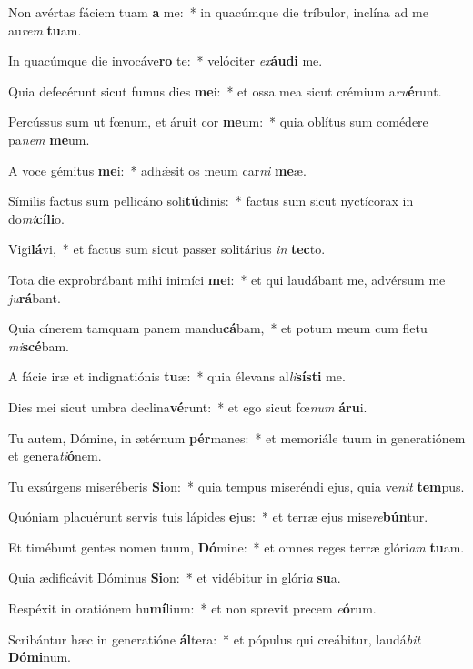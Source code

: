 \item Non avértas fáciem tuam \textbf{a} me:~* in quacúmque die tríbulor, inclína ad me au\textit{rem} \textbf{tu}am.
\item In quacúmque die invocáve\textbf{ro} te:~* velóciter \textit{ex}\textbf{áu}\textbf{di} me.
\item Quia defecérunt sicut fumus dies \textbf{me}i:~* et ossa mea sicut crémium a\textit{ru}\textbf{é}runt.
\item Percússus sum ut fœnum, et áruit cor \textbf{me}um:~* quia oblítus sum comédere pa\textit{nem} \textbf{me}um.
\item A voce gémitus \textbf{me}i:~* adhǽsit os meum car\textit{ni} \textbf{me}æ.
\item Símilis factus sum pellicáno soli\textbf{tú}dinis:~* factus sum sicut nyctícorax in do\textit{mi}\textbf{cí}\textbf{li}o.
\item Vigi\textbf{lá}vi,~* et factus sum sicut passer solitárius \textit{in} \textbf{tec}to.
\item Tota die exprobrábant mihi inimíci \textbf{me}i:~* et qui laudábant me, advérsum me \textit{ju}\textbf{rá}bant.
\item Quia cínerem tamquam panem mandu\textbf{cá}bam,~* et potum meum cum fletu \textit{mi}\textbf{scé}bam.
\item A fácie iræ et indignatiónis \textbf{tu}æ:~* quia élevans al\textit{li}\textbf{sís}\textbf{ti} me.
\item Dies mei sicut umbra declina\textbf{vé}runt:~* et ego sicut fœ\textit{num} \textbf{á}\textbf{ru}i.
\item Tu autem, Dómine, in ætérnum \textbf{pér}manes:~* et memoriále tuum in generatiónem et genera\textit{ti}\textbf{ó}nem.
\item Tu exsúrgens miseréberis \textbf{Si}on:~* quia tempus miseréndi ejus, quia ve\textit{nit} \textbf{tem}pus.
\item Quóniam placuérunt servis tuis lápides \textbf{e}jus:~* et terræ ejus mise\textit{re}\textbf{bún}tur.
\item Et timébunt gentes nomen tuum, \textbf{Dó}mine:~* et omnes reges terræ glóri\textit{am} \textbf{tu}am.
\item Quia ædificávit Dóminus \textbf{Si}on:~* et vidébitur in glóri\textit{a} \textbf{su}a.
\item Respéxit in oratiónem hu\textbf{mí}lium:~* et non sprevit precem \textit{e}\textbf{ó}rum.
\item Scribántur hæc in generatióne \textbf{ál}tera:~* et pópulus qui creábitur, laudá\textit{bit} \textbf{Dó}\textbf{mi}num.
